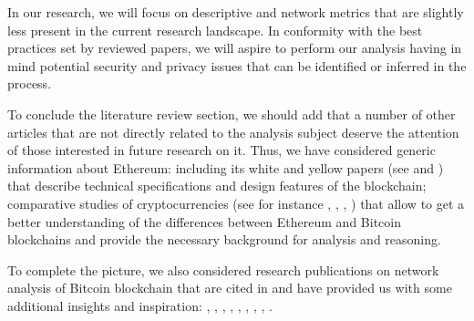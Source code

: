 In our research, we will focus on descriptive and network metrics that are slightly less present in the current research landscape.
In conformity with the best practices set by reviewed papers, we will aspire to perform our analysis having in mind potential security and privacy issues that can be identified or inferred in the process.

To conclude the literature review section, we should add that a number of other articles that are not directly related to the analysis subject deserve the attention of those interested in future research on it. 
Thus, we have considered generic information about Ethereum: 
including its white and yellow papers (see \cite{buterin2014next} and \cite{wood2014Ethereum}) that describe technical specifications and design features of the blockchain; 
comparative studies of cryptocurrencies (see for instance \cite{maesa2018blockchain}, 
\cite{rudlang2017comparative}, 
\cite{sapuric2017distributed}, 
\cite{anderson2016new}) that allow to get a better understanding of the differences between Ethereum and Bitcoin blockchains and provide the necessary background for analysis and reasoning.

To complete the picture, we also considered research publications on network analysis of Bitcoin blockchain that are cited in \cite{lischke2016analyzing} and have provided us with some additional insights and inspiration: 
\cite{reid2013analysis}, 
\cite{baumann2014exploring}, 
\cite{drainville2012analysis}, 
\cite{ober2013structure}, 
\cite{meiklejohn2013fistful}, 
\cite{spagnuolo2014bitiodine}, 
\cite{androulaki2013evaluating}, 
\cite{kaminsky2011black}, 
\cite{ortega2013bitcoin}.






